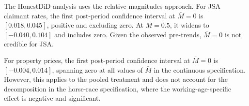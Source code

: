 \documentclass[12pt]{article}
\begin{document}
The HonestDiD analysis uses the \citet{rambachan2023} relative-magnitudes approach. For JSA claimant rates, the first post-period confidence interval at $\bar{M} = 0$ is $[0.018, 0.045]$, positive and excluding zero. At $\bar{M} = 0.5$, it widens to $[-0.040, 0.104]$ and includes zero. Given the observed pre-trends, $\bar{M} = 0$ is not credible for JSA.

For property prices, the first post-period confidence interval at $\bar{M} = 0$ is $[-0.004, 0.014]$, spanning zero at all values of $\bar{M}$ in the continuous specification. However, this applies to the pooled treatment and does not account for the decomposition in the horse-race specification, where the working-age-specific effect is negative and significant.
\end{document}
